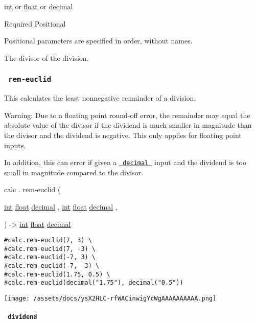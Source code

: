 \href{/docs/reference/foundations/int/}{int} {or}
\href{/docs/reference/foundations/float/}{float} {or}
\href{/docs/reference/foundations/decimal/}{decimal}

{Required} {{ Positional }}

\label{functions-div-euclid-divisor-positional-tooltip}
Positional parameters are specified in order, without names.

The divisor of the division.

\subsubsection{\texorpdfstring{\texttt{\ rem-euclid\ }}{ rem-euclid }}\label{functions-rem-euclid}

This calculates the least nonnegative remainder of a division.

Warning: Due to a floating point round-off error, the remainder may
equal the absolute value of the divisor if the dividend is much smaller
in magnitude than the divisor and the dividend is negative. This only
applies for floating point inputs.

In addition, this can error if given a
\href{/docs/reference/foundations/decimal/}{\texttt{\ decimal\ }} input
and the dividend is too small in magnitude compared to the divisor.

calc { . } { rem-euclid } (

{ \href{/docs/reference/foundations/int/}{int}
\href{/docs/reference/foundations/float/}{float}
\href{/docs/reference/foundations/decimal/}{decimal} , } {
\href{/docs/reference/foundations/int/}{int}
\href{/docs/reference/foundations/float/}{float}
\href{/docs/reference/foundations/decimal/}{decimal} , }

) -\textgreater{} \href{/docs/reference/foundations/int/}{int}
\href{/docs/reference/foundations/float/}{float}
\href{/docs/reference/foundations/decimal/}{decimal}

\begin{verbatim}
#calc.rem-euclid(7, 3) \
#calc.rem-euclid(7, -3) \
#calc.rem-euclid(-7, 3) \
#calc.rem-euclid(-7, -3) \
#calc.rem-euclid(1.75, 0.5) \
#calc.rem-euclid(decimal("1.75"), decimal("0.5"))
\end{verbatim}

\texttt{[image: /assets/docs/ysX2HLC-rfWACinwigYcWgAAAAAAAAAA.png]}

\paragraph{\texorpdfstring{\texttt{\ dividend\ }}{ dividend }}\label{functions-rem-euclid-dividend}


